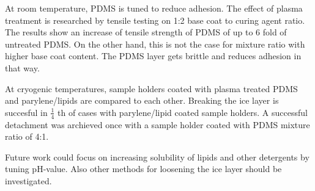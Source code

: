 At room temperature, PDMS is tuned to reduce adhesion. The effect of plasma treatment is researched by tensile testing on 1:2 base coat to curing agent ratio. The results show an increase of tensile strength of PDMS of up to 6 fold of untreated PDMS. On the other hand, this is not the case for mixture ratio with higher base coat content. The PDMS layer gets brittle and reduces adhesion in that way.

At cryogenic temperatures, sample holders coated with plasma treated PDMS and parylene/lipids are compared to each other. Breaking the ice layer is succesful in $\frac{1}{4}$ th of cases with parylene/lipid coated sample holders. A successful detachment was archieved once with a sample holder coated with PDMS mixture ratio of 4:1.

Future work could focus on increasing solubility of lipids and other detergents by tuning pH-value. Also other methods for loosening the ice layer should be investigated. 

